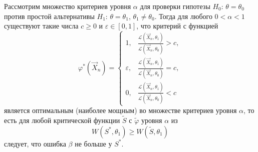 \begin{theorem}\label{th:N-P}
	Рассмотрим множество критериев уровня $ \alpha $ для проверки гипотезы $ H_0
	$: $ \theta = \theta_0 $ против простой альтернативы $ H_1 $: $ \theta =
	\theta_1 $, $ \theta_1 \neq \theta_0 $. Тогда для любого $ 0 < \alpha < 1 $
	существуют такие числа $ c \geqslant 0 $ и $ \varepsilon \in [0, 1] $, что
	критерий с функцией  
	\[
	\varphi^\ast(\vec X_n) = \begin{cases}
    1, & \frac{\mathscr L(\vec X_n, \theta_1)}
      {\mathscr L(\vec X_n, \theta_0)} > c,\\[0.4em]
		\varepsilon, & \frac{\mathscr L(\vec X_n, \theta_1)}
      {\mathscr L(\vec X_n, \theta_0)} = c,\\[0.4em]
		0, & \frac{\mathscr L(\vec X_n, \theta_1)}
      {\mathscr L(\vec X_n, \theta_0)} < c
	\end{cases}
	\]
является оптимальным (наиболее мощным) во множестве критериев уровня $ \alpha $,
то есть для любой критической функции $ \tilde S $ с $ \tilde \varphi $ уровня
$ \alpha$ из
\[
		W(S^\ast, \theta_1) \geqslant W(\tilde S, \theta_1)
\]
следует, что ошибка $ \beta $ не больше у $ S^\ast $.
\end{theorem}
